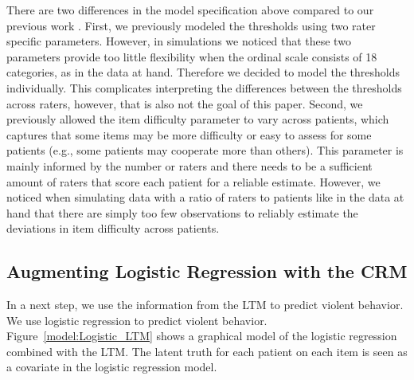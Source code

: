 \documentclass[a4paper,11pt]{article}
\newcommand{\DB}[1]{\todo[inline, color=colorDon]{DB: {#1}}}
\begin{document}
There are two differences in the model specification above compared to our previous work \parencite{vandenBergh2020cultural}.
First, we previously modeled the thresholds using two rater specific parameters.
However, in simulations we noticed that these two parameters provide too little flexibility when the ordinal scale consists of 18 categories, as in the data at hand.
Therefore we decided to model the thresholds individually.
This complicates interpreting the differences between the thresholds across raters, however, that is also not the goal of this paper.
Second, we previously allowed the item difficulty parameter to vary across patients, which captures that some items may be more difficulty or easy to assess for some patients (e.g., some patients may cooperate more than others).
This parameter is mainly informed by the number or raters and there needs to be a sufficient amount of raters that score each patient for a reliable estimate.
However, we noticed when simulating data with a ratio of raters to patients like in the data at hand that there are simply too few observations to reliably estimate the deviations in item difficulty across patients.


%
%
%
%
%


\subsection{Augmenting Logistic Regression with the CRM}
In a next step, we use the information from the LTM to predict violent behavior.
We use logistic regression to predict violent behavior.
Figure~\ref{model:Logistic_LTM} shows a graphical model of the logistic regression combined with the LTM.
The latent truth for each patient on each item is seen as a covariate in the logistic regression model.
\end{document}
